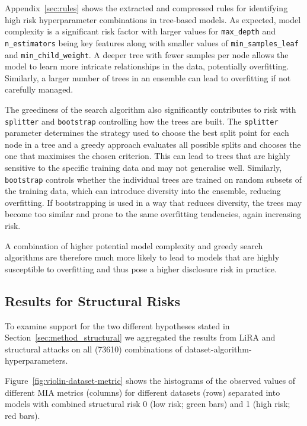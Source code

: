 



Appendix~\ref{sec:rules} shows the extracted and compressed rules for identifying high risk hyperparameter combinations in tree-based models. As expected, model complexity is a significant risk factor with larger values for \texttt{max\_depth} and \texttt{n\_estimators} being key features along with smaller values of \texttt{min\_samples\_leaf} and \texttt{min\_child\_weight}. A deeper tree with fewer samples per node allows the model to learn more intricate relationships in the data, potentially overfitting. Similarly, a larger number of trees in an ensemble can lead to overfitting if not carefully managed.

The greediness of the search algorithm also significantly contributes to risk with \texttt{splitter} and \texttt{bootstrap} controlling how the trees are built. The \texttt{splitter} parameter determines the strategy used to choose the best split point for each node in a tree and a greedy approach evaluates all possible splits and chooses the one that maximises the chosen criterion. This can lead to trees that are highly sensitive to the specific training data and may not generalise well. Similarly, \texttt{bootstrap} controls whether the individual trees are trained on random subsets of the training data, which can introduce diversity into the ensemble, reducing overfitting. If bootstrapping is used in a way that reduces diversity, the trees may become too similar and prone to the same overfitting tendencies, again increasing risk.

A combination of higher potential model complexity and greedy search algorithms are therefore much more likely to lead to models that are highly susceptible to overfitting and thus pose a higher disclosure risk in practice.

\subsection{Results for Structural Risks}%
\label{sec:structural-results}

To examine support for the two different hypotheses stated in Section~\ref{sec:method_structural} we aggregated the results from LiRA and structural attacks on all (73610) combinations of dataset-algorithm-hyperparameters.

Figure~\ref{fig:violin-dataset-metric} shows the histograms of the observed values of different MIA metrics (columns) for different datasets (rows) separated into models with combined structural risk 0 (low risk; green bars) and 1 (high risk; red bars). 

